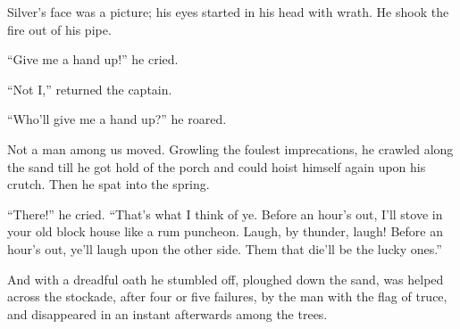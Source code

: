 Silver’s face was a picture; his eyes started in his head with wrath. He shook the fire out of his pipe.

\enquote{Give me a hand up!} he cried.

\enquote{Not I,} returned the captain.

\enquote{Who’ll give me a hand up?} he roared.

Not a man among us moved. Growling the foulest imprecations, he crawled along the sand till he got hold of the porch and could hoist himself again upon his crutch. Then he spat into the spring.

\enquote{There!} he cried. \enquote{That’s what I think of ye. Before an hour’s out, I’ll stove in your old block house like a rum puncheon. Laugh, by thunder, laugh! Before an hour’s out, ye’ll laugh upon the other side. Them that die’ll be the lucky ones.}

And with a dreadful oath he stumbled off, ploughed down the sand, was helped across the stockade, after four or five failures, by the man with the flag of truce, and disappeared in an instant afterwards among the trees.